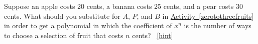 \documentclass{book}
\begin{document}
\setcounter{project}{242}
\addtocounter{project}{-1}
\begin{activity}[]\label{activity-235}
\hypertarget{p-1313}{}%
Suppose an apple costs 20 cents, a banana costs 25 cents, and a pear costs 30 cents. What should you substitute for \(A\), \(P\), and \(B\) in \hyperref[zerotothreefruits]{Activity~\ref{zerotothreefruits}} in order to get a polynomial in which the coefficient of \(x^n\) is the number of ways to choose a selection of fruit that costs \(n\) cents?%
~\hfill{\tiny\hyperlink{a-242}{[hint]}\hypertarget{q-242}{}}\end{activity}
\end{document}
